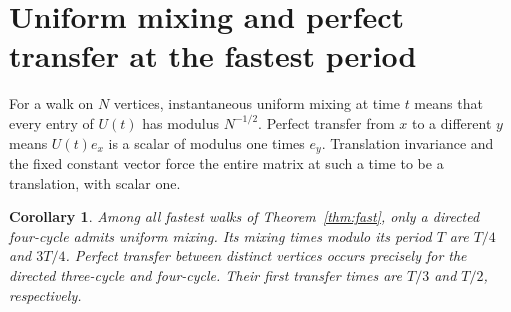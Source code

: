 \documentclass[11pt]{article}
\newtheorem{corollary}[theorem]{Corollary}
\begin{document}
\section{Uniform mixing and perfect transfer at the fastest period}
For a walk on $N$ vertices, instantaneous uniform mixing at time $t$ means that every entry of $U(t)$ has modulus $N^{-1/2}$. Perfect transfer from $x$ to a different $y$ means $U(t)e_x$ is a scalar of modulus one times $e_y$. Translation invariance and the fixed constant vector force the entire matrix at such a time to be a translation, with scalar one.

\begin{corollary}
Among all fastest walks of Theorem~\ref{thm:fast}, only a directed four-cycle admits uniform mixing. Its mixing times modulo its period $T$ are $T/4$ and $3T/4$. Perfect transfer between distinct vertices occurs precisely for the directed three-cycle and four-cycle. Their first transfer times are $T/3$ and $T/2$, respectively.
\end{corollary}
\end{document}
